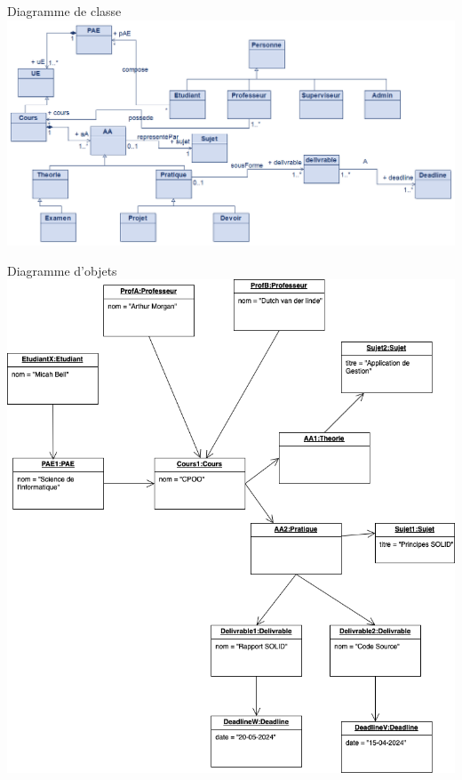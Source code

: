 \documentclass[numbering=fraction]{beamer}
\begin{document}
\begin{frame}{Diagramme de classe}
    \includegraphics[]{classe.png}
\end{frame}

\begin{frame}{Diagramme d'objets}
     \includegraphics[]{objet.png}
\end{frame}
\end{document}

